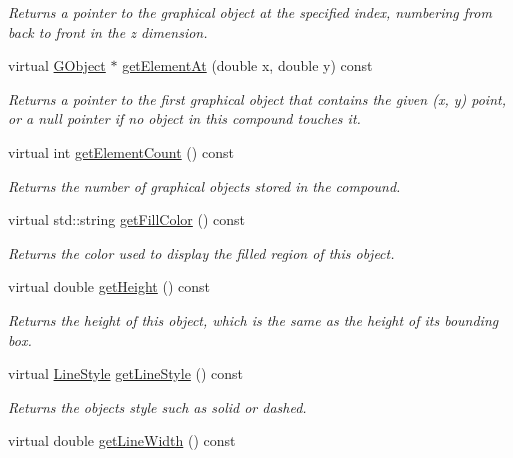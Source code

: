 \begin{DoxyCompactItemize}
\begin{DoxyCompactList}\small\item\em Returns a pointer to the graphical object at the specified index, numbering from back to front in the {\itshape z} dimension. \end{DoxyCompactList}\item 
virtual \mbox{\hyperlink{classGObject}{G\+Object}} $\ast$ \mbox{\hyperlink{classGCompound_a25efa999eca5790ec26ef091b05f961c}{get\+Element\+At}} (double x, double y) const
\begin{DoxyCompactList}\small\item\em Returns a pointer to the first graphical object that contains the given (x, y) point, or a null pointer if no object in this compound touches it. \end{DoxyCompactList}\item 
virtual int \mbox{\hyperlink{classGCompound_adf7d37ec315f859648def92e6b32408f}{get\+Element\+Count}} () const
\begin{DoxyCompactList}\small\item\em Returns the number of graphical objects stored in the compound. \end{DoxyCompactList}\item 
virtual std\+::string \mbox{\hyperlink{classGObject_a76f6964a11fde7c78e9751be184e1a3c}{get\+Fill\+Color}} () const
\begin{DoxyCompactList}\small\item\em Returns the color used to display the filled region of this object. \end{DoxyCompactList}\item 
virtual double \mbox{\hyperlink{classGObject_a1e7e353362434072875264cf95629f99}{get\+Height}} () const
\begin{DoxyCompactList}\small\item\em Returns the height of this object, which is the same as the height of its bounding box. \end{DoxyCompactList}\item 
virtual \mbox{\hyperlink{classGObject_a86e0f5648542856159bb40775c854aa7}{Line\+Style}} \mbox{\hyperlink{classGObject_aaf1f5ea8281e5e3486662878d26f0a13}{get\+Line\+Style}} () const
\begin{DoxyCompactList}\small\item\em Returns the object\textquotesingle{}s style such as solid or dashed. \end{DoxyCompactList}\item 
virtual double \mbox{\hyperlink{classGObject_a85ff266dc3eb63d9f2d8e5a4487fd3c0}{get\+Line\+Width}} () const

\end{DoxyCompactItemize}
